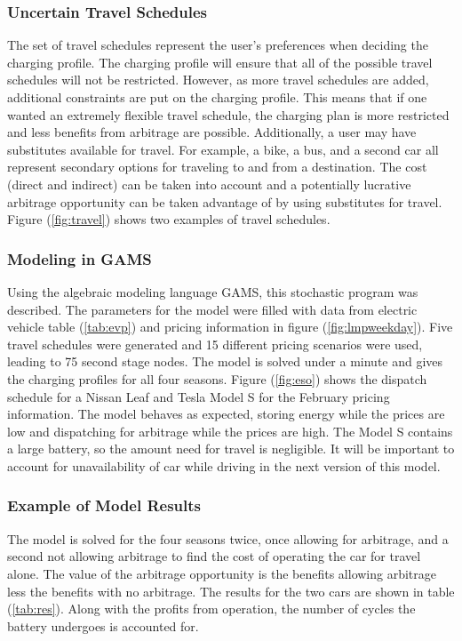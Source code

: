 \subsubsection{Uncertain Travel Schedules}
The set of travel schedules represent the user's preferences when deciding the charging profile.  The charging profile will ensure that all of the possible travel schedules will not be restricted.  However, as more travel schedules are added, additional constraints are put on the charging profile.  This means that if one wanted an extremely flexible travel schedule, the charging plan is more restricted and less benefits from arbitrage are possible.  Additionally, a user may have substitutes available for travel.  For example, a bike, a bus, and a second car all represent secondary options for traveling to and from a destination.  The cost (direct and indirect) can be taken into account and a potentially lucrative arbitrage opportunity can be taken advantage of by using substitutes for travel.  Figure (\ref{fig:travel}) shows two examples of travel schedules. 


   

\subsubsection{Modeling in GAMS}
Using the algebraic modeling language GAMS, this stochastic program was described.  The parameters for the model were filled with data from electric vehicle table (\ref{tab:evp}) and pricing information in figure (\ref{fig:lmpweekday}).  Five travel schedules were generated and 15 different pricing scenarios were used, leading to 75 second stage nodes.  The model is solved under a minute and gives the charging profiles for all four seasons.  Figure (\ref{fig:eso}) shows the dispatch schedule for a Nissan Leaf and Tesla Model S for the February pricing information.  The model behaves as expected, storing energy while the prices are low and dispatching for arbitrage while the prices are high.  The Model S contains a large battery, so the amount need for travel is negligible.  It will be important to account for unavailability of car while driving in the next version of this model.



\subsubsection{Example of Model Results}
The model is solved for the four seasons twice, once allowing for arbitrage, and a second not allowing arbitrage to find the cost of operating the car for travel alone.  The value of the arbitrage opportunity is the benefits allowing arbitrage less the benefits with no arbitrage.  The results for the two cars are shown in table (\ref{tab:res}).  Along with the profits from operation, the number of cycles the battery undergoes is accounted for.

